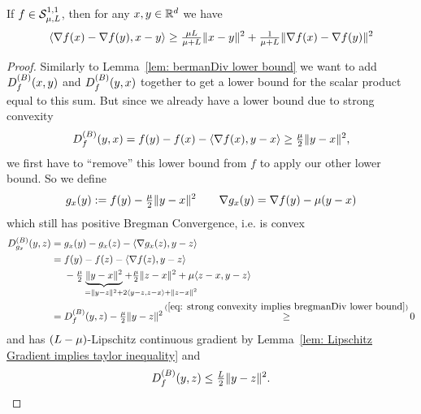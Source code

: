 \begin{lemma}
	\label{lem: bermanDiv lower bound (strongly convex)}
	If \(f\in\mathcal{S}^{1,1}_{{\mu},{L}}\), then for any
	\(x,y\in\mathbb{R}^d\) we have
	\begin{align*}
		\langle \nabla f(x) - \nabla f(y), x-y\rangle 
		\ge \tfrac{\mu L}{\mu+L} \| x-y\|^2
		+ \tfrac{1}{\mu+L}\|\nabla f(x) -\nabla f(y)\|^2
	\end{align*}
\end{lemma}
\begin{proof}
	Similarly to Lemma~\ref{lem: bermanDiv lower bound} we want to
	add \(D^{(B)}_{f}(x,y)\) and \(D^{(B)}_{f}(y,x)\) together to
	get a lower bound for the scalar product equal to this sum. But since we
	already have a lower bound due to strong convexity
	\begin{align}\label{eq: strong convexity implies bregmanDiv lower bound}
		D^{(B)}_{f}(y,x) = f(y) - f(x) -\langle\nabla f(x), y-x\rangle
		\ge \tfrac{\mu}2 \|y-x\|^2,
	\end{align}
	we first have to ``remove'' this lower bound from \(f\) to apply our other
	lower bound. So we define
	\begin{align*}
		g_x(y) := f(y) - \tfrac{\mu}2\|y-x\|^2 \qquad
		\nabla g_x(y) = \nabla f(y) - \mu(y-x)
	\end{align*}
	which still has positive Bregman Convergence, i.e. is convex
	\begin{align*}
		\bregmanDiv{g_x}(y,z)
		&= g_x(y) - g_x(z) - \langle\nabla g_x(z), y-z\rangle \\
		&= 
		\begin{aligned}[t]
			& f(y) - f(z) -\langle\nabla f(z), y-z\rangle \\
			&- \tfrac\lbound{2}\underbrace{\|y-x\|^2}_{
				=\|y-z\|^2 + \mathrlap{2\langle y-z, z-x\rangle + \|z-x\|^2}
			}
			+ \tfrac\lbound{2}\|z-x\|^2
			+ \lbound\langle z-x, y-z\rangle
		\end{aligned}\\
		&= \bregmanDiv{f}(y,z) - \tfrac{\lbound}2\|y-z\|^2
		\xge{(\ref{eq: strong convexity implies bregmanDiv lower bound})} 0
	\end{align*}
	and has \((L-\mu)\)-Lipschitz continuous gradient by
	Lemma~\ref{lem: Lipschitz Gradient implies taylor inequality} and 
	\begin{align}
		\label{eq: bregmanDiv upper bound}
		\bregmanDiv{f}(y,z) \le \tfrac{\ubound}2\|y-z\|^2.

\end{align}
\end{proof}
